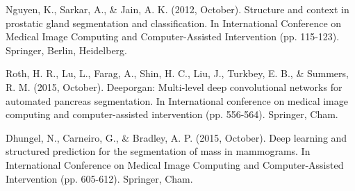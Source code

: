 \documentclass[10pt,twocolumn]{article}
\begin{document}
\begin{thebibliography}{}
Nguyen, K., Sarkar, A., \& Jain, A. K. (2012, October). Structure and context in prostatic gland segmentation and classification. In International Conference on Medical Image Computing and Computer-Assisted Intervention (pp. 115-123). Springer, Berlin, Heidelberg.

Roth, H. R., Lu, L., Farag, A., Shin, H. C., Liu, J., Turkbey, E. B., \& Summers, R. M. (2015, October). Deeporgan: Multi-level deep convolutional networks for automated pancreas segmentation. In International conference on medical image computing and computer-assisted intervention (pp. 556-564). Springer, Cham.

Dhungel, N., Carneiro, G., \& Bradley, A. P. (2015, October). Deep learning and structured prediction for the segmentation of mass in mammograms. In International Conference on Medical Image Computing and Computer-Assisted Intervention (pp. 605-612). Springer, Cham.
\end{thebibliography}
\end{document}
